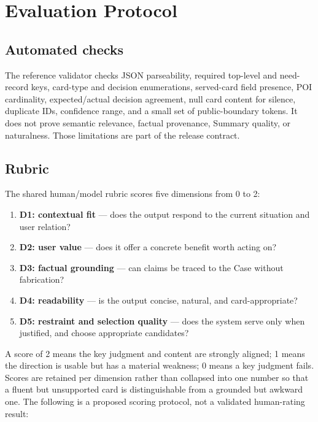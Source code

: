 \documentclass[10pt]{article}
\begin{document}
\section{Evaluation Protocol}

\subsection{Automated checks}

The reference validator checks JSON parseability, required top-level and need-record keys, card-type and decision enumerations, served-card field presence, POI cardinality, expected/actual decision agreement, null card content for silence, duplicate IDs, confidence range, and a small set of public-boundary tokens. It does not prove semantic relevance, factual provenance, Summary quality, or naturalness. Those limitations are part of the release contract.

\subsection{Rubric}

The shared human/model rubric scores five dimensions from 0 to 2:
\begin{enumerate}
  \item \textbf{D1: contextual fit} --- does the output respond to the current situation and user relation?
  \item \textbf{D2: user value} --- does it offer a concrete benefit worth acting on?
  \item \textbf{D3: factual grounding} --- can claims be traced to the Case without fabrication?
  \item \textbf{D4: readability} --- is the output concise, natural, and card-appropriate?
  \item \textbf{D5: restraint and selection quality} --- does the system serve only when justified, and choose appropriate candidates?
\end{enumerate}
A score of 2 means the key judgment and content are strongly aligned; 1 means the direction is usable but has a material weakness; 0 means a key judgment fails. Scores are retained per dimension rather than collapsed into one number so that a fluent but unsupported card is distinguishable from a grounded but awkward one. The following is a proposed scoring protocol, not a validated human-rating result:
\end{document}
